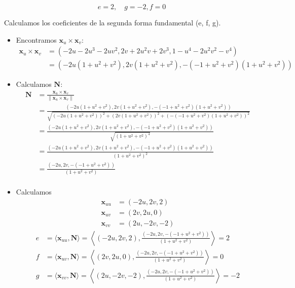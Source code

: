 \begin{problema}
\begin{enumerate}
    $$
    e=2, \quad g=-2, f=0
    $$
    \begin{sol}
        Calculamos los coeficientes de la segunda forma fundamental (e, f, g).
        \begin{itemize}
            \item Encontramos $\mathbf{x}_u \times \mathbf{x}_v$: 
            \begin{align*}
                \mathbf{x}_u \times \mathbf{x}_v &= \left(-2 u-2 u^3-2 u v^2,2 v+2 u^2 v+2 v^3,1-u^4-2 u^2 v^2-v^4\right)\\
                &= (-2 u (1+u^2+v^2),2 v (1+u^2+v^2),-(-1+u^2+v^2) (1+u^2+v^2))
            \end{align*}
            \item Calculamos $\mathbf{N}$: 
            \begin{align*}
                \mathbf{N} &= \frac{\mathbf{x}_u \times \mathbf{x}_v}{\| \mathbf{x}_u \times \mathbf{x}_v \|}\\
                &= \frac{(-2 u (1+u^2+v^2),2 v (1+u^2+v^2),-(-1+u^2+v^2) (1+u^2+v^2))}{\sqrt{(-2 u (1+u^2+v^2))^2+(2 v (1+u^2+v^2))^2+(-(-1+u^2+v^2) (1+u^2+v^2))^2}}\\
                &= \frac{(-2 u (1+u^2+v^2),2 v (1+u^2+v^2),-(-1+u^2+v^2) (1+u^2+v^2))}{\sqrt{(1+u^2+v^2)^4}}\\
                &= \frac{(-2 u (1+u^2+v^2),2 v (1+u^2+v^2),-(-1+u^2+v^2) (1+u^2+v^2))}{(1+u^2+v^2)^2}\\
                &= \frac{(-2 u ,2 v ,-(-1+u^2+v^2))}{(1+u^2+v^2)}\\
            \end{align*}
            \item Calculamos 
            \begin{align*}
                \mathbf{x}_{uu} &= (-2 u,2 v,2)\\
                \mathbf{x}_{uv} &= (2 v,2 u,0)\\
                \mathbf{x}_{vv} &= (2 u,-2 v,-2)
            \end{align*}
            \begin{align*}
                e &= \langle \mathbf{x}_{uu}, \mathbf{N} \rangle = \left\langle (-2 u,2 v,2),\frac{(-2 u ,2 v ,-(-1+u^2+v^2))}{(1+u^2+v^2)} \right\rangle =2\\
                f &= \langle \mathbf{x}_{uv}, \mathbf{N} \rangle =\left\langle (2 v,2 u,0),\frac{(-2 u ,2 v ,-(-1+u^2+v^2))}{(1+u^2+v^2)} \right\rangle= 0\\
                g &= \langle \mathbf{x}_{vv}, \mathbf{N} \rangle =\left\langle (2 u,-2 v,-2),\frac{(-2 u ,2 v ,-(-1+u^2+v^2))}{(1+u^2+v^2)} \right\rangle =-2 
            \end{align*}
            

\end{itemize}
\end{sol}
\end{enumerate}
\end{problema}
